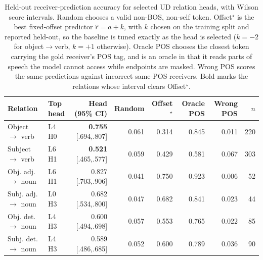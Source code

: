 \documentclass{article} %
\begin{document}
\begin{table}[t]
\centering
\footnotesize
\setlength{\tabcolsep}{3pt}
\renewcommand{\arraystretch}{1.08}
\begin{tabular*}{\textwidth}{@{\extracolsep{\fill}}llrrrrrr}
\toprule
Relation & Top head & Head (95\% CI) & Random & Offset$^\star$ & Oracle POS & Wrong POS & $n$ \\
\midrule
Object $\to$ verb & L4 H0 & \textbf{0.755} {\scriptsize[.694,.807]} & 0.061 & 0.314 & 0.845 & 0.011 & 220 \\
Subject $\to$ verb & L6 H1 & \textbf{0.521} {\scriptsize[.465,.577]} & 0.059 & 0.429 & 0.581 & 0.067 & 303 \\
Obj. adj. $\to$ noun & L6 H1 & 0.827 {\scriptsize[.703,.906]} & 0.041 & 0.750 & 0.923 & 0.006 & 52 \\
Subj. adj. $\to$ noun & L0 H3 & 0.682 {\scriptsize[.534,.800]} & 0.047 & 0.682 & 0.841 & 0.023 & 44 \\
Obj. det. $\to$ noun & L4 H3 & 0.600 {\scriptsize[.494,.698]} & 0.057 & 0.553 & 0.765 & 0.022 & 85 \\
Subj. det. $\to$ noun & L4 H3 & 0.589 {\scriptsize[.486,.685]} & 0.052 & 0.600 & 0.789 & 0.036 & 90 \\
\bottomrule
\end{tabular*}
\caption{Held-out receiver-prediction accuracy for selected UD relation heads, with Wilson score intervals. Random chooses a valid non-BOS, non-self token. Offset$^\star$ is the best fixed-offset predictor $\hat{r}=a+k$, with $k$ chosen on the training split and reported held-out, so the baseline is tuned exactly as the head is selected ($k=-2$ for object$\to$verb, $k=+1$ otherwise). Oracle POS chooses the closest token carrying the gold receiver's POS tag, and is an oracle in that it reads parts of speech the model cannot access while endpoints are masked. Wrong POS scores the same predictions against incorrect same-POS receivers. Bold marks the relations whose interval clears Offset$^\star$.}

\label{tab:relation_baselines}
\end{table}
\end{document}
